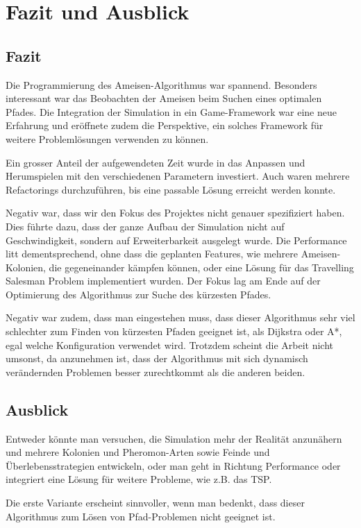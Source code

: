 
\chapter{Fazit und Ausblick}

\section{Fazit}

Die Programmierung des Ameisen-Algorithmus war spannend. Besonders interessant
war das Beobachten der Ameisen beim Suchen eines optimalen Pfades. Die
Integration der Simulation in ein Game-Framework war eine neue Erfahrung und
eröffnete zudem die Perspektive, ein solches Framework für weitere
Problemlösungen verwenden zu können.

Ein grosser Anteil der aufgewendeten Zeit wurde in das Anpassen und Herumspielen
mit den verschiedenen Parametern investiert. Auch waren mehrere Refactorings
durchzuführen, bis eine passable Lösung erreicht werden konnte.

Negativ war, dass wir den Fokus des Projektes nicht genauer spezifiziert haben.
Dies führte dazu, dass der ganze Aufbau der Simulation nicht auf
Geschwindigkeit, sondern auf Erweiterbarkeit ausgelegt wurde. Die Performance
litt dementsprechend, ohne dass die geplanten Features, wie mehrere
Ameisen-Kolonien, die gegeneinander kämpfen können, oder eine Lösung für das
Travelling Salesman Problem implementiert wurden. Der Fokus lag am Ende auf der
Optimierung des Algorithmus zur Suche des kürzesten Pfades.

Negativ war zudem, dass man eingestehen muss, dass dieser Algorithmus sehr viel
schlechter zum Finden von kürzesten Pfaden geeignet ist, als Dijkstra oder A*,
egal welche Konfiguration verwendet wird. Trotzdem scheint die Arbeit nicht
umsonst, da anzunehmen ist, dass der Algorithmus mit sich dynamisch verändernden
Problemen besser zurechtkommt als die anderen beiden.

\section{Ausblick}

Entweder könnte man versuchen, die Simulation mehr der Realität anzunähern und
mehrere Kolonien und Pheromon-Arten sowie Feinde und Überlebensstrategien
entwickeln, oder man geht in Richtung Performance oder integriert eine Lösung
für weitere Probleme, wie z.B. das TSP.

Die erste Variante erscheint sinnvoller, wenn man bedenkt, dass dieser
Algorithmus zum Lösen von Pfad-Problemen nicht geeignet ist.


